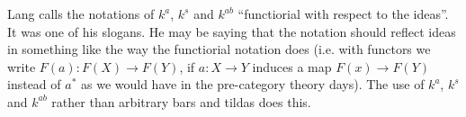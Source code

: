 \begin{bergman}
    Lang calls the notations of $k^a$, $k^s$ and $k^{ab}$ ``functiorial with respect to the ideas''. It was one of his slogans. He may be saying that the notation should reflect ideas in something like the way the functiorial notation does (i.e. with functors we write $F(a)\colon F(X)\rightarrow F(Y)$, if $a\colon X\rightarrow Y$ induces a map $F(x)\rightarrow F(Y)$ instead of $a^\ast$ as we would have in the pre-category theory days). 
    The use of $k^a$, $k^s$ and $k^{ab}$ rather than arbitrary bars and tildas does this.
\end{bergman}


\printindex
